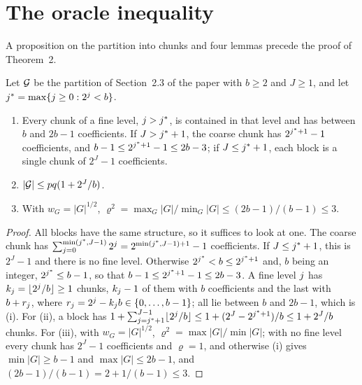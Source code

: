 \section{The oracle inequality}
\setcounter{equation}{0}




A proposition on the partition into chunks and four lemmas
precede the proof of Theorem~2.


\begin{proposition}
\label{prop:balanced}
Let $\mathcal{G}$ be the partition of Section~2.3 of the paper with $b \ge 2$ and
$J \ge 1$, and let $j^{*} = \max\{j \ge 0 : 2^{j} < b\}$.
\begin{enumerate}
\item[(i)] Every chunk of a fine level, $j > j^{*}$, is contained in that
level and has between $b$ and $2b-1$ coefficients. If $J > j^{*}+1$, the coarse
chunk has $2^{j^{*}+1}-1$ coefficients, and $b-1 \le 2^{j^{*}+1}-1 \le 2b-3$;
if $J \le j^{*}+1$, each block is a single chunk of $2^{J}-1$ coefficients.
\item[(ii)] $|\mathcal{G}| \le pq(1 + 2^{J}/b)$.
\item[(iii)] With $w_{G} = |G|^{1/2}$,
$\varrho^{2} = \max_{G}|G|/\min_{G}|G| \le (2b-1)/(b-1) \le 3$.
\end{enumerate}
\end{proposition}

\begin{proof}
All blocks have the same structure, so it suffices to look at one. The coarse
chunk has $\sum_{j=0}^{\min(j^{*},J-1)}2^{j} = 2^{\min(j^{*},J-1)+1}-1$
coefficients. If $J \le j^{*}+1$, this is $2^{J}-1$ and there is no fine level.
Otherwise $2^{j^{*}} < b \le 2^{j^{*}+1}$ and, $b$ being an integer,
$2^{j^{*}} \le b-1$, so that $b-1 \le 2^{j^{*}+1}-1 \le 2b-3$. A fine level
$j$ has $k_{j} = \lfloor 2^{j}/b\rfloor \ge 1$ chunks, $k_{j}-1$ of
them with $b$ coefficients and the last with $b + r_{j}$, where
$r_{j} = 2^{j} - k_{j}b \in \{0,\dots,b-1\}$; all lie between $b$ and
$2b-1$, which is (i). For (ii), a block has
$1 + \sum_{j=j^{*}+1}^{J-1}\lfloor 2^{j}/b\rfloor \le
1 + (2^{J}-2^{j^{*}+1})/b \le 1 + 2^{J}/b$ chunks. For (iii), with
$w_{G} = |G|^{1/2}$, $\varrho^{2} = \max|G|/\min|G|$; with no fine level every
chunk has $2^{J}-1$ coefficients and $\varrho = 1$, and otherwise (i) gives
$\min|G| \ge b-1$ and $\max|G| \le 2b-1$, and
$(2b-1)/(b-1) = 2 + 1/(b-1) \le 3$.
\end{proof}



